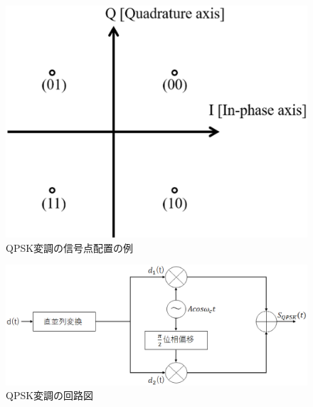 \begin{figure}[t]
  \begin{center}
    \includegraphics[scale = 0.25]{./chapter2/figure/qpskiq.eps}
    \caption{QPSK変調の信号点配置の例}
    \label{fig:qpskIQ}
  \end{center}
\end{figure}
\begin{figure}[t]
  \begin{center}
    \includegraphics[scale = 0.25]{./chapter2/figure/qpskshift.eps}
    \caption{QPSK変調の回路図}
    \label{fig:qpskmod}
  \end{center}
\end{figure}

